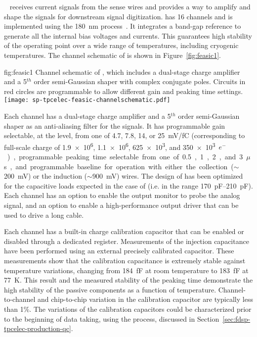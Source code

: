 ~\cite{DeGeronimo:2011zz} receives 
current signals from the  sense wires and provides a way to 
amplify and shape the signals for downstream signal digitization. 
 has \num{16} channels and is implemented 
using the  \SI{180}{nm}  process~\cite{TSMC180}. It 
integrates a band-gap reference to generate all the internal bias 
voltages and currents. This guarantees high stability of the operating 
point over a wide range of temperatures, including cryogenic temperatures. 
The channel schematic of  is shown in 
Figure~\ref{fig:feasic1}. 

\begin{dunefigure}
{fig:feasic1}
{Channel schematic of , which includes a 
dual-stage charge amplifier and a \num{5}$^{th}$ order semi-Gaussian 
shaper with complex conjugate poles. Circuits in red circles are 
programmable to allow different gain and peaking time settings.}
\texttt{[image: sp-tpcelec-feasic-channelschematic.pdf]}
\end{dunefigure}

Each  channel has a dual-stage charge amplifier 
and a \num{5}$^{th}$ order semi-Gaussian shaper as an anti-aliasing 
filter for the  signals. It has programmable gain 
selectable, at the  level, from one of \num{4.7}, \num{7.8}, \num{14}, or \SI{25}{mV/fC}
(corresponding to full-scale charge of \num{1.9e6}, \num{1.1e6}, \num{625e3}, 
and \SI{350e3}{$e^-$}), programmable peaking time selectable from one of 
\num{0.5}, \num{1}, \num{2}, and \SI{3}{$\mu$s}, and programmable 
baseline for operation with either the collection ($\sim$\SI{200}{mV}) 
or the induction ($\sim$\SI{900}{mV}) wires. The design of
 has been optimized for the capacitive
loads expected in the case of  (i.e. in the range \SIrange{170}{210}{pF}).
Each channel has an 
option to enable the output monitor to probe the analog signal, and 
an option to enable a high-performance output driver that can be 
used to drive a long cable. 

Each  channel has a built-in charge calibration 
capacitor that can be enabled or disabled through a dedicated register. 
Measurements of the injection capacitance have been performed using an 
external precisely calibrated capacitor. These measurements show that
the calibration capacitance is extremely stable against temperature variations, 
changing from \SI{184}{fF} at room temperature to 
\SI{183}{fF} at \SI{77}{K}. This result and the measured stability of 
the peaking time demonstrate the high stability of the passive 
components as a function of temperature. Channel-to-channel and 
chip-to-chip variation in the calibration capacitor are typically 
less than \num{1}\%. The variations of the calibration capacitors
could be characterized prior to the beginning of 
data taking, using the  process, discussed in
Section~\ref{sec:fdsp-tpcelec-production-qc}.

